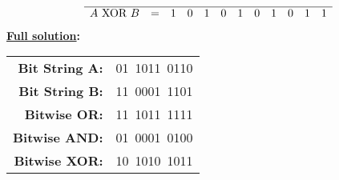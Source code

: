 \begin{tcolorbox}[title=Example of bitwise operations]
\[\begin{array}{c c c c c c c c c c c c c}
\hline
A \text{ XOR } B & = & 1 & 0 & 1 & 0 & 1 & 0 & 1 & 0 & 1 & 1
\end{array}
\]
\textbf{\underline{Full solution}:}
\begin{center}
\begin{tabular}{>{\bfseries}r l}
Bit String A:   & 01\ 1011\ 0110 \\
Bit String B:   & 11\ 0001\ 1101 \\
\hline
Bitwise OR:     & 11\ 1011\ 1111 \\
Bitwise AND:    & 01\ 0001\ 0100 \\
Bitwise XOR:    & 10\ 1010\ 1011 \\
\end{tabular}
\end{center}





\end{tcolorbox}




